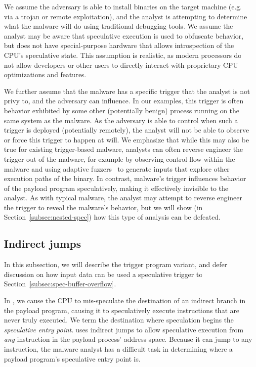 We assume the adversary is able to install binaries on the target machine (e.g.
via a trojan or remote exploitation), and the analyst is attempting to determine
what the malware will do using traditional debugging tools. We assume the
analyst may be aware that speculative execution is used to obfuscate behavior,
but does not have special-purpose hardware that allows introspection of the
CPU's speculative state. This assumption is realistic, as modern processors do
not allow developers or other users to directly interact with proprietary CPU
optimizations and features.

We further assume that the malware has a specific trigger that the analyst is
not privy to, and the adversary can influence. In our examples, this
trigger is often behavior exhibited by some other (potentially benign) process
running on the same system as the malware. As the adversary is able to control
when such a trigger is deployed (potentially remotely), the analyst will not be
able to observe or force this trigger to happen at will. We emphasize that while
this may also be true for existing trigger-based malware, analysts can often
reverse engineer the trigger out of the malware, for example by observing
control flow within the malware and using adaptive
fuzzers~\cite{afl,stephens2016driller} to generate inputs that explore other
execution paths of the binary. In contrast, \speculake malware's trigger
influences behavior of the payload program speculatively, making it effectively
invisible to the analyst. As with typical
malware, the analyst may attempt to reverse engineer the trigger to reveal the
malware's behavior, but we will show (in Section~\ref{subsec:nested-spec}) how
this type of analysis can be defeated.

\subsection{Indirect jumps}

In this subsection, we will describe the trigger program variant, and defer discussion 
on how input data can be used a speculative trigger to
Section~\ref{subsec:spec-buffer-overflow}.

In \speculake, we cause the CPU to mis-speculate the destination of an indirect
branch in the payload program, causing it to speculatively execute 
instructions that are never truly executed. We term the destination where speculation begins
the \emph{speculative entry point}. \speculake uses indirect jumps to allow
speculative execution from \emph{any} instruction in the payload process'
address space. Because it can jump to any instruction, the malware analyst has a
difficult task in determining where a payload program's speculative entry point
is.

